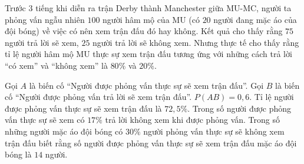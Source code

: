 \begin{ex}
Trước $3$ tiếng khi diễn ra trận Derby thành Manchester giữa MU-MC, người ta phỏng vấn ngẫu nhiên $100$ người hâm mộ của MU (có $20$ người đang mặc áo của đội bóng) về việc có nên xem trận đấu đó hay không. Kết quả cho thấy rằng $75$ người trả lời sẽ xem, $25$ người trả lời sẽ không xem. Nhưng thực tế cho thấy rằng tỉ lệ người hâm mộ MU thực sự xem trận đấu tương ứng với những cách trả lời ``có xem'' và ``không xem'' là $80\%$ và $20\%$.

Gọi $A$ là biến cố ``Người được phỏng vấn thực sự sẽ xem trận đấu''. Gọi $B$ là biến cố ``Người được phỏng vấn trả lời sẽ xem trận đấu''.
\choiceTF
{\True $P(AB)=0{,}6$.}
{Tỉ lệ người được phỏng vấn thực sự sẽ xem trận đấu là $72{,}5\%$.}
{Trong số người được phỏng vấn thực sự sẽ xem có $17\%$ trả lời không xem khi được phỏng vấn.}
{\True Trong số những người mặc áo đội bóng có $30\%$ người phỏng vấn thực sự sẽ không xem trận đấu biết rằng số người được phỏng vấn thực sự sẽ xem trận đấu mặc áo đội bóng là $14$ người.}
\end{ex}
